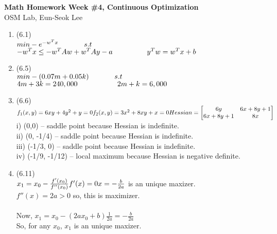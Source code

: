 \documentclass[letterpaper,12pt]{article}
\theoremstyle{definition}
\begin{document}
\begin{flushleft}
   \textbf{\large{Math Homework Week \#4, Continuous Optimization}} \\[5pt]
   OSM Lab, Eun-Seok Lee \\[5pt]

\end{flushleft}

\vspace{5mm}

\begin{enumerate}



	\item (6.1) \\
$min -e^{-w^Tx} \\
\phantom{----}s.t$ $-w^Tx \leq - w^TAw + w^TAy - a\\
\phantom{-----}y^Tw = w^Tx +b$


	\item (6.5) \\
$min -(0.07m + 0.05k) \\
\phantom{----}s.t$ $4m + 3k = 240,000\\
\phantom{------}2m + k = 6,000$

	\item (6.6) \\
$f_1(x,y) = 6xy + 4y^2 + y = 0\\
f_2(x, y) = 3x^2 + 8xy + x = 0\\  \\
Hessian =  \begin{bmatrix} 6y& 6x+8y+1 \\ 6x+8y+1& 8x \end{bmatrix}\\$
i) (0,0) -- saddle point because Hessian is indefinite.\\
ii) (0, -1/4) -- saddle point because Hessian is indefinite.\\
iii) (-1/3, 0) -- saddle point because Hessian is indefinite.\\
iv) (-1/9, -1/12) -- local maximum because Hessian is negative definite.\\


	\item (6.11) \\
$ x_1 = x_0 - \frac{f'(x_0)}{f''(x_0)}\\
f'(x) = 0\\
x = -\frac{b}{2a} $ is an unique maxizer. \\
$f''(x) = 2a > 0$ so, this is maximizer. \\
\\
Now, $x_1 = x_0 - (2ax_0 +b)\frac{1}{2a} = -\frac{b}{2a}$ \\
So, for any $x_0$, $x_1$ is an unique maxizer.
 



\end{enumerate}
\end{document}
